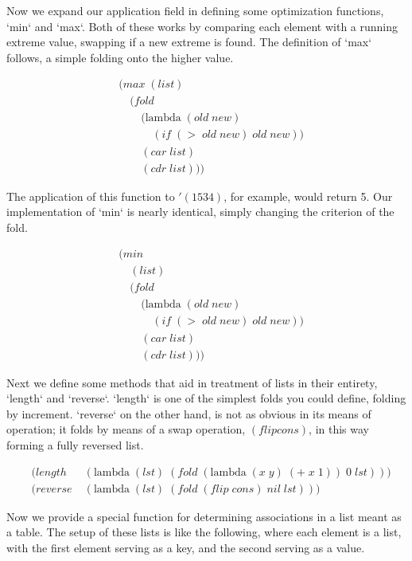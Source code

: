 Now we expand our application field in defining some optimization functions, `min` 
and `max`. Both of these works by comparing each element with a running extreme 
value, swapping if a new extreme is found. The definition of `max` follows, a 
simple folding onto the higher value.

\begin{align*}
& (max \; (list)
\\& \quad (fold \; 
\\& \qquad (\text{lambda} \; (old \; new)
\\& \qquad \quad (if \; (> \; old \; new) \; old \; new))
\\& \qquad (car \; list)
\\& \qquad (cdr \; list)))
\end{align*}

The application of this function to $'(1 5 3 4)$, for example, would return 5. Our 
implementation of `min` is nearly identical, simply changing the criterion of the 
fold.

\begin{align*}
& (min \; 
\\& \quad (list)
\\& \quad (fold \; 
\\& \qquad (\text{lambda} \; (old \; new)
\\& \qquad \quad (if \; (> \; old \; new) \; old \; new))
\\& \qquad (car \; list)
\\& \qquad (cdr \; list)))
\end{align*}

Next we define some methods that aid in treatment of lists in their entirety, 
`length` and `reverse`. `length` is one of the simplest folds you could define, 
folding by increment. `reverse` on the other hand, is not as obvious in its means 
of operation; it folds by means of a swap operation, $(flip cons)$, in this way 
forming a fully reversed list.

\begin{align*}
& (length \; &(\text{lambda} \; (lst) \; (fold \; (\text{lambda} \; (x \; y) \; (+ \; x \; 1)) \; 0 \; lst)))
\\& (reverse \; &(\text{lambda} \; (lst) \; (fold \; (flip \; cons) \; nil \; lst)))
\end{align*}

Now we provide a special function for determining associations in a list meant as 
a table. The setup of these lists is like the following, where each element is a 
list, with the first element serving as a key, and the second serving as a value.

